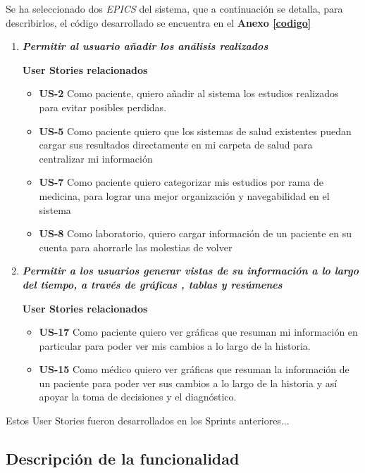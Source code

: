 \documentclass[a4paper,12pt]{article}
\begin{document}
Se ha seleccionado dos \textit{EPICS} del sistema, que a continuación se detalla, para describirlos, el código desarrollado se encuentra en el \textbf{Anexo \ref{codigo}}
\begin{enumerate}
\item \textit{\textbf{Permitir al usuario añadir los análisis realizados }}

\textbf{User Stories relacionados}
    \begin{itemize}
        \item \textbf{US-2 }Como paciente, quiero añadir al sistema los estudios realizados para evitar posibles perdidas.
        \item \textbf{US-5 }Como paciente quiero que los sistemas de salud existentes puedan cargar sus resultados directamente en mi carpeta de salud para centralizar mi información
        \item  \textbf{US-7} Como paciente quiero categorizar mis estudios por rama de medicina, para lograr una mejor organización y navegabilidad en el sistema
        \item \textbf{US-8} Como laboratorio, quiero cargar información de un paciente en su cuenta para ahorrarle las molestias de volver
    \end{itemize}
\item \textbf{\textit{Permitir a los usuarios generar vistas de su información a lo largo del tiempo, a través de gráficas , tablas y resúmenes }}

\textbf{User Stories relacionados}
    \begin{itemize}
        \item \textbf{US-17} Como paciente quiero ver gráficas que resuman mi información en particular para poder ver mis cambios a lo largo de la historia.
        \item \textbf{US-15} Como médico quiero ver gráficas que resuman la información de un paciente para poder ver sus cambios a lo largo de la historia y así apoyar la toma de decisiones y el diagnóstico.
    \end{itemize}
\end{enumerate}
Estos User Stories fueron desarrollados en los Sprints anteriores...

\subsection{Descripción de la funcionalidad} %
\end{document}
